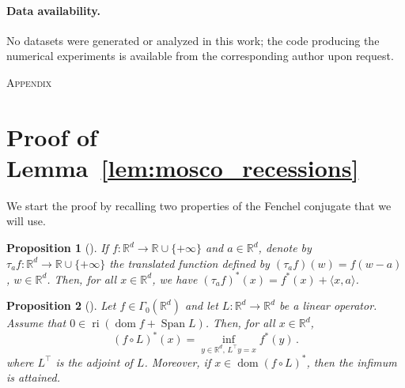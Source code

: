 \documentclass[11pt,english,reqno]{article}
\DeclareMathOperator{\Span}{Span}
\DeclareMathOperator{\dom}{dom}
\DeclareMathOperator{\ri}{ri}
\newcommand{\R}{\mathbb{R}}
\theoremstyle{plain}
\newtheorem{proposition}{Proposition}[section]
\theoremstyle{definition}
\theoremstyle{remark}
\numberwithin{equation}{section}
\begin{document}
\paragraph*{Data availability.} No datasets were generated or analyzed in this work; the code producing the numerical experiments is available from the corresponding author upon request.





\clearpage

\appendix

\begin{center}
	\textsc{\Huge Appendix}	
\end{center}

\vspace*{1cm}





\section{Proof of Lemma~\ref{lem:mosco_recessions}}
\label{sec:proof-mosco_recessions}

We start the proof by recalling two properties of the Fenchel conjugate that we will use.

\begin{proposition}[{\cite[Prop.~13.23(iii)]{bauschke2017convex}}]
	\label{prop:translation-conjugate}
If $f: \R^d \to \R \cup \{ +\infty \}$ and $a \in \R^d$, denote by $\tau_a f: \R^d \to \R \cup \{ +\infty \}$ the translated function defined by $(\tau_a f)(w) = f(w - a)$, $w \in \R^d$. Then, for all $x \in \R^d$, we have $(\tau_a f)^*(x) = f^*(x) + \langle x, a \rangle$.
\end{proposition}

\begin{proposition}[{\cite[Coro.~15.28]{bauschke2017convex}}]
\label{prop:conjugate_composition}
Let $f\in \Gamma_0(\R^d)$ and let $L: \R^d \to \R^d$ be a linear operator. Assume that $0 \in \ri(\dom f + \Span L)$. Then, for all $x \in \R^d$,
\begin{equation*}
	(f \circ L)^*(x) = \inf_{y \in \R^d, \,  L^\top y = x} f^*(y)   \, .
\end{equation*}
where $L^\top$ is the adjoint of $L$. Moreover, if $x \in \dom (f \circ L)^*$, then the infimum is attained.
\end{proposition}
\end{document}
